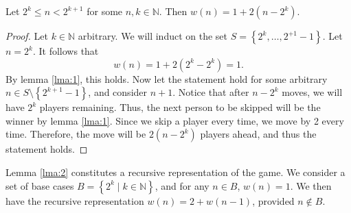 \documentclass[11pt, letterpaper]{article}
\begin{document}
\begin{lemma}[Recursive]\label{lma:2}
	Let $2^k\leq n<2^{k+1}$ for some $n,k\in\mathbb{N}$. Then $w(n)=1+2(n-2^k)$.
\end{lemma}
\begin{proof}
	Let $k\in\mathbb{N}$ arbitrary. We will induct on the set $S=\left\{ 2^k, \ldots, 2^{+1}-1 \right\} $. Let $n=2^k$. It follows that
	\[
		w(n)=1+2\left( 2^k-2^k \right) =1
	.\]
	By lemma \ref{lma:1}, this holds. Now let the statement hold for some arbitrary $n\in S\setminus\left\{ 2^{k+1}-1 \right\} $, and consider $n+1$. Notice that after $n-2^{k}$ moves, we will have $2^k$ players remaining. Thus, the next person to be skipped will be the winner by lemma \ref{lma:1}. Since we skip a player every time, we move by 2 every time. Therefore, the move will be $2(n-2^k)$ players ahead, and thus the statement holds.
\end{proof}

Lemma \ref{lma:2} constitutes a recursive representation of the game. We consider a set of base cases $B=\left\{ 2^k \mid k\in\mathbb{N} \right\} $, and for any $n\in B$, $w(n)=1$. We then have the recursive representation $w(n)=2+w(n-1)$, provided $n \notin B$.
\end{document}
